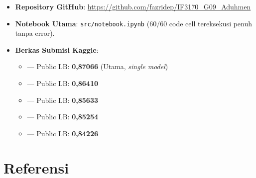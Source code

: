 \documentclass[11pt,a4paper]{article}
\numberwithin{figure}{section}
\numberwithin{table}{section}
\begin{document}
\begin{itemize}[leftmargin=1.2cm, itemsep=3pt]
  \item \textbf{Repository GitHub}: \url{https://github.com/fazridep/IF3170_G09_Aduhmen}
  \item \textbf{Notebook Utama}: \texttt{src/notebook.ipynb} (60/60 code cell tereksekusi penuh tanpa error).
  \item \textbf{Berkas Submisi Kaggle}:
    \begin{itemize}[leftmargin=1.0cm, itemsep=2pt]
      \item {} --- Public LB: \textbf{0,87066} (Utama, \textit{single model})
      \item {} --- Public LB: \textbf{0,86410}
      \item {} --- Public LB: \textbf{0,85633}
      \item {} --- Public LB: \textbf{0,85254}
      \item {} --- Public LB: \textbf{0,84226}
    \end{itemize}
\end{itemize}

\clearpage
\section{Referensi}
\end{document}
